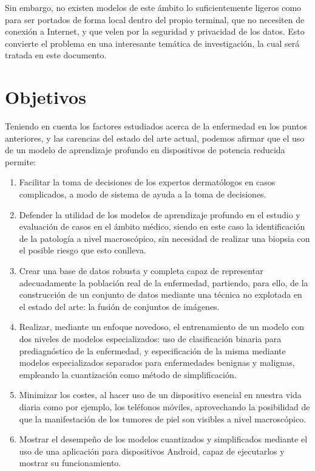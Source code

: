 Sin embargo, no existen modelos de este ámbito lo suficientemente ligeros como para ser portados de forma local dentro del propio terminal, que no necesiten de conexión a Internet, y que velen por la seguridad y privacidad de los datos. Esto convierte el problema en una interesante temática de investigación, la cual será tratada en este documento.

\section{Objetivos}
\label{cap:objetivos}

Teniendo en cuenta los factores estudiados acerca de la enfermedad en los puntos anteriores, y las carencias del estado del arte actual, podemos afirmar que el uso de un modelo de aprendizaje profundo en dispositivos de potencia reducida permite:
\begin{enumerate}
	\item Facilitar la toma de decisiones de los expertos dermatólogos en casos complicados, a modo de sistema de ayuda a la toma de decisiones.
	\item Defender la utilidad de los modelos de aprendizaje profundo en el estudio y evaluación de casos en el ámbito médico, siendo en este caso la identificación de la patología a nivel macroscópico, sin necesidad de realizar una biopsia con el posible riesgo que esto conlleva.
	\item Crear una base de datos robusta y completa capaz de representar adecuadamente la población real de la enfermedad, partiendo, para ello, de la construcción de un conjunto de datos mediante una técnica no explotada en el estado del arte: la fusión de conjuntos de imágenes.
	\item Realizar, mediante un enfoque novedoso, el entrenamiento de un modelo con dos niveles de modelos especializados: uso de clasificación binaria para prediagnóstico de la enfermedad, y especificación de la misma mediante modelos especializados separados para enfermedades benignas y malignas, empleando la cuantización como método de simplificación.
	\item Minimizar los costes, al hacer uso de un dispositivo esencial en nuestra vida diaria como por ejemplo, los teléfonos móviles, aprovechando la posibilidad de que la manifestación de los tumores de piel son visibles a nivel macroscópico.
	\item Mostrar el desempeño de los modelos cuantizados y simplificados mediante el uso de una aplicación para dispositivos Android, capaz de ejecutarlos y mostrar su funcionamiento.
\end{enumerate}

